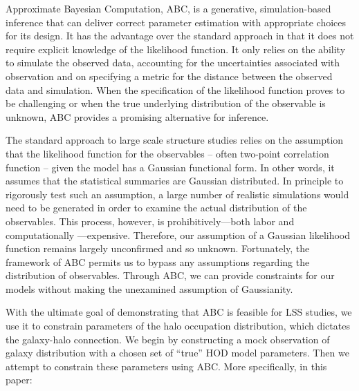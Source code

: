 Approximate Bayesian Computation, ABC, is a generative, simulation-based
inference that can deliver correct parameter estimation with
appropriate choices for its design.
It has the advantage over the standard approach in that it 
does not require explicit knowledge of the likelihood function. It only relies on the ability to simulate
the observed data, accounting for the uncertainties associated with observation and on specifying a metric 
for the distance between the observed data and simulation. When the specification of the likelihood function 
proves to be challenging or when the true underlying distribution of the observable is unknown, 
ABC provides a promising alternative for inference.

The standard approach to large scale structure studies relies on the assumption that the likelihood function 
for the observables -- often two-point correlation function -- given the model has a Gaussian functional form. 
In other words, it assumes that the statistical summaries are Gaussian distributed. In principle to rigorously 
test such an assumption, a large number of realistic simulations would need to be generated in order to examine 
the actual distribution of the observables. This process, however, is prohibitively---both labor and computationally 
---expensive. Therefore, our assumption of a Gaussian likelihood function remains largely unconfirmed and so 
unknown. Fortunately, the framework of ABC permits us to bypass any 
assumptions regarding the distribution of observables. Through ABC, we can provide constraints for our models without making the unexamined assumption of Gaussianity. 

With the ultimate goal of demonstrating that ABC is feasible for LSS studies, we use it to 
constrain parameters of the halo occupation distribution, which dictates the galaxy-halo connection. 
We begin by constructing a mock observation of galaxy distribution with a chosen set of ``true'' HOD model 
parameters. Then we attempt to constrain these parameters using ABC. More specifically, in this paper: 

